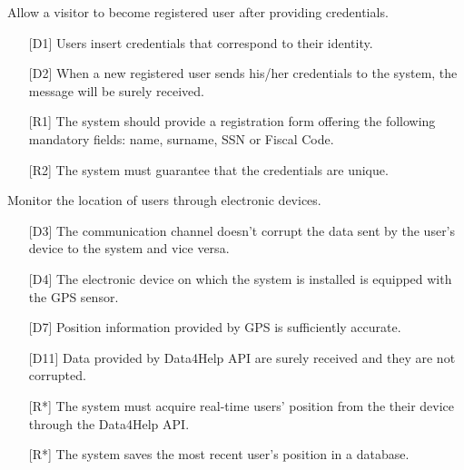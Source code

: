 \begin{enumerate} [resume, label={[G\arabic*]}]
    \item Allow a visitor to become registered user after providing credentials.
        \begin{itemize}
            \item [{[D1]}] Users insert credentials that correspond to their identity.
            \item [{[D2]}] When a new registered user sends his/her credentials to the system, the message will be surely received.
            \item [{[R1]}] The system should provide a registration form offering the following mandatory fields: name, surname, SSN or Fiscal Code.
            \item [{[R2]}] The system must guarantee that the credentials are unique.
        \end{itemize}
        
    \item Monitor the location of users through electronic devices.
        \begin{itemize}
            \item [{[D3]}] The communication channel doesn't corrupt the data sent by the user's device to the system and vice versa.
            \item [{[D4]}] The electronic device on which the system is installed is equipped with the GPS sensor.
            \item [{[D7]}] Position information provided by GPS is sufficiently accurate.
            \item [{[D11]}] Data  provided  by  Data4Help  API  are  surely  received  and  they  are  not corrupted.
            \item [{[R*]}] The system must acquire real-time users' position from the their device through the Data4Help API.
            \item [{[R*]}] The system saves the most recent user's position in a database.
        \end{itemize}
        

\end{enumerate}
